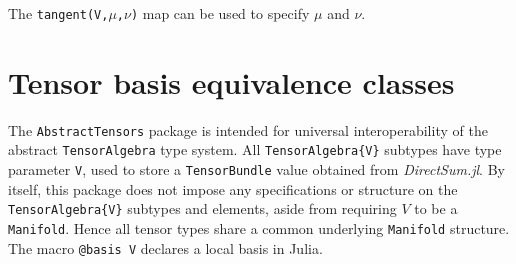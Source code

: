\documentclass{juliacon}
\begin{document}
The \verb`tangent(V,`$\mu$\verb`,`$\nu$\verb`)` map can be used to specify $\mu$ and $\nu$.

\section{Tensor basis equivalence classes}%

The \verb`AbstractTensors` package is intended for universal interoperability of the abstract \verb`TensorAlgebra` type system.
All \verb`TensorAlgebra{V}` subtypes have type parameter \verb`V`, used to store a \verb`TensorBundle` value obtained from \textit{DirectSum.jl}.
By itself, this package does not impose any specifications or structure on the \verb`TensorAlgebra{V}` subtypes and elements, aside from requiring $V$ to be a \verb`Manifold`.
Hence all tensor types share a common underlying \verb`Manifold` structure.
The macro \verb`@basis V` declares a local basis in Julia.
\end{document}
